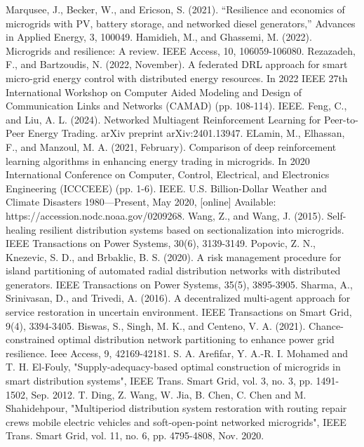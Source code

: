\documentclass[conference]{IEEEtran}
\begin{document}
\begin{thebibliography}{00}
 Marqusee, J., Becker, W., and Ericson, S. (2021).  ``Resilience and economics of microgrids with PV, battery storage, and networked diesel generators,'' Advances in Applied Energy, 3, 100049.
 Hamidieh, M., and Ghassemi, M. (2022). Microgrids and resilience: A review. IEEE Access, 10, 106059-106080.
 Rezazadeh, F., and Bartzoudis, N. (2022, November). A federated DRL approach for smart micro-grid energy control with distributed energy resources. In 2022 IEEE 27th International Workshop on Computer Aided Modeling and Design of Communication Links and Networks (CAMAD) (pp. 108-114). IEEE.
 Feng, C., and Liu, A. L. (2024). Networked Multiagent Reinforcement Learning for Peer-to-Peer Energy Trading. arXiv preprint arXiv:2401.13947.
 ELamin, M., Elhassan, F., and Manzoul, M. A. (2021, February). Comparison of deep reinforcement learning algorithms in enhancing energy trading in microgrids. In 2020 International Conference on Computer, Control, Electrical, and Electronics Engineering (ICCCEEE) (pp. 1-6). IEEE.
 U.S. Billion-Dollar Weather and Climate Disasters 1980—Present, May 2020, [online] Available: https://accession.nodc.noaa.gov/0209268.
 Wang, Z., and Wang, J. (2015). Self-healing resilient distribution systems based on sectionalization into microgrids. IEEE Transactions on Power Systems, 30(6), 3139-3149.
 Popovic, Z. N., Knezevic, S. D., and Brbaklic, B. S. (2020). A risk management procedure for island partitioning of automated radial distribution networks with distributed generators. IEEE Transactions on Power Systems, 35(5), 3895-3905.
 Sharma, A., Srinivasan, D., and Trivedi, A. (2016). A decentralized multi-agent approach for service restoration in uncertain environment. IEEE Transactions on Smart Grid, 9(4), 3394-3405.
 Biswas, S., Singh, M. K., and Centeno, V. A. (2021). Chance-constrained optimal distribution network partitioning to enhance power grid resilience. Ieee Access, 9, 42169-42181.
 S. A. Arefifar, Y. A.-R. I. Mohamed and T. H. El-Fouly, "Supply-adequacy-based optimal construction of microgrids in smart distribution systems", IEEE Trans. Smart Grid, vol. 3, no. 3, pp. 1491-1502, Sep. 2012.
 T. Ding, Z. Wang, W. Jia, B. Chen, C. Chen and M. Shahidehpour, "Multiperiod distribution system restoration with routing repair crews mobile electric vehicles and soft-open-point networked microgrids", IEEE Trans. Smart Grid, vol. 11, no. 6, pp. 4795-4808, Nov. 2020.

\end{thebibliography}
\end{document}
